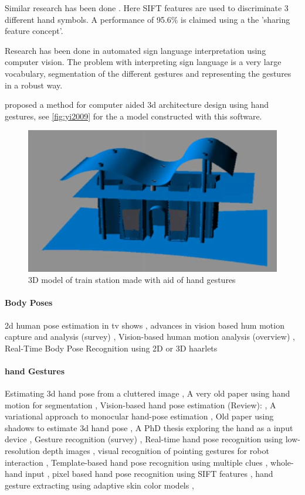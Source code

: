 Similar research has been done \cite{Wang2007}. Here SIFT features are used to discriminate 3 different hand symbols. A performance of 95.6\% is claimed using a the 'sharing feature concept'.


Research has been done in automated sign language interpretation using computer vision\cite{Buehler2009}\cite{RichardBowden2004}. The problem with interpreting sign language is a very large vocabulary, segmentation of the different gestures and representing the gestures in a robust way.

\cite{Yi2009} proposed a method for computer aided 3d architecture design using hand gestures, see \autoref{fig:yi2009} for the a model constructed with this software.

\begin{figure}[htbp]
	\center{}
	\includegraphics[width=0.6\linewidth]{figures/yi2009.png}
	\caption{3D model of train station made with aid of hand gestures}
	\label{fig:yi2009}
\end{figure}


\paragraph{Body Poses}
2d human pose estimation in tv shows \cite{ferrari2008},
advances in vision based hum motion capture and analysis (survey) \cite{Moeslund2006},
Vision-based human motion analysis (overview) \cite{Poppe2007},
Real-Time Body Pose Recognition using 2D or 3D haarlets \cite{VandenBergh2009}

\paragraph{hand Gestures}
Estimating 3d hand pose from a cluttered image \cite{Athitsos2003},
A very old paper using hand motion for segmentation \cite{Cui1996},
Vision-based hand pose estimation (Review): \cite{Erol2007},
A variational approach to monocular hand-pose estimation \cite{laGorce2010},
Old paper using shadows to estimate 3d hand pose \cite{Segen1999},
A PhD thesis exploring the hand as a input device \cite{Sturman1992},
Gesture recognition (survey) \cite{Mitra2007},
Real-time hand pose recognition using low-resolution depth images \cite{Mo2006},
visual recognition of pointing gestures for robot interaction \cite{Nickel2007},
Template-based hand pose recognition using multiple clues \cite{Stenger2006},
whole-hand input \cite{Sturman1992},
pixel based hand pose recognition using SIFT features \cite{Wang2007},
hand gesture extracting using adaptive skin color models \cite{Xiong2006},

